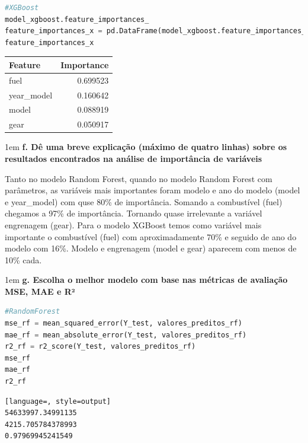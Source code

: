 \begin{lstlisting}[language=Python, style=input]
#XGBoost
model_xgboost.feature_importances_
feature_importances_x = pd.DataFrame(model_xgboost.feature_importances_, index = X_train.columns, columns=['importance']).sort_values('importance', ascending = False)
feature_importances_x
\end{lstlisting}
\begin{table}[H]
\centering
\begin{tabular}{lr}
\hline
\textbf{Feature} & \textbf{Importance} \\
\hline
fuel        & 0.699523 \\
year\_model & 0.160642 \\
model       & 0.088919 \\
gear        & 0.050917 \\
\hline
\end{tabular}
\label{tab:feature_importance_latest}
\end{table}



\begin{adjustwidth}{1em}{}
\textbf{f. Dê uma breve explicação (máximo de quatro linhas) sobre os resultados encontrados na análise de importância de
variáveis}
\end{adjustwidth}

Tanto no modelo Random Forest, quando no modelo Random Forest com parâmetros, as variáveis mais importantes foram modelo e ano do modelo (model e year\_model) com quse 80\% de importância. Somando a combustível (fuel) chegamos a 97\% de importância. Tornando quase irrelevante a variável engrenagem (gear). Para o modelo XGBoost temos como variável mais importante o combustível (fuel) com aproximadamente 70\% e seguido de ano do modelo com 16\%. Modelo e engrenagem (model e gear) aparecem com menos de 10\% cada.

\begin{adjustwidth}{1em}{}
\textbf{g. Escolha o melhor modelo com base nas métricas de avaliação MSE, MAE e R²}
\end{adjustwidth}
\begin{lstlisting}[language=Python, style=input]
#RandomForest
mse_rf = mean_squared_error(Y_test, valores_preditos_rf)
mae_rf = mean_absolute_error(Y_test, valores_preditos_rf)
r2_rf = r2_score(Y_test, valores_preditos_rf)
mse_rf
mae_rf
r2_rf
\end{lstlisting}
\begin{lstlisting}[language=, style=output]
54633997.34991135
4215.705784378993
0.97969945241549
\end{lstlisting}


